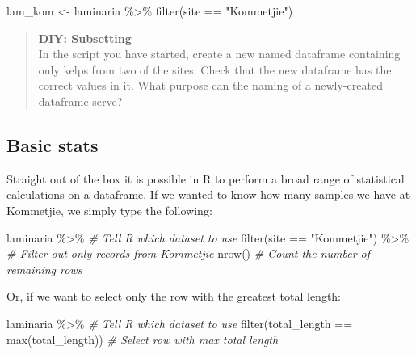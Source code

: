 \documentclass[
]{book}
\newenvironment{Shaded}{\begin{snugshade}}{\end{snugshade}}
\newcommand{\CommentTok}[1]{\textcolor[rgb]{0.56,0.35,0.01}{\textit{#1}}}
\newcommand{\FunctionTok}[1]{\textcolor[rgb]{0.00,0.00,0.00}{#1}}
\newcommand{\NormalTok}[1]{#1}
\newcommand{\OtherTok}[1]{\textcolor[rgb]{0.56,0.35,0.01}{#1}}
\newcommand{\SpecialCharTok}[1]{\textcolor[rgb]{0.00,0.00,0.00}{#1}}
\newcommand{\StringTok}[1]{\textcolor[rgb]{0.31,0.60,0.02}{#1}}
\begin{document}
\begin{Shaded}
\begin{Highlighting}[]
\NormalTok{lam\_kom }\OtherTok{\textless{}{-}}\NormalTok{ laminaria }\SpecialCharTok{\%\textgreater{}\%} 
  \FunctionTok{filter}\NormalTok{(site }\SpecialCharTok{==} \StringTok{"Kommetjie"}\NormalTok{)}
\end{Highlighting}
\end{Shaded}

\begin{quote}
\textbf{DIY: Subsetting}\\
In the script you have started, create a new named dataframe containing only kelps from two of the sites. Check that the new dataframe has the correct values in it. What purpose can the naming of a newly-created dataframe serve?
\end{quote}

\hypertarget{basic-stats}{%
\subsection{Basic stats}\label{basic-stats}}

Straight out of the box it is possible in R to perform a broad range of statistical calculations on a dataframe. If we wanted to know how many samples we have at Kommetjie, we simply type the following:

\begin{Shaded}
\begin{Highlighting}[]
\NormalTok{laminaria }\SpecialCharTok{\%\textgreater{}\%} \CommentTok{\# Tell R which dataset to use}
  \FunctionTok{filter}\NormalTok{(site }\SpecialCharTok{==} \StringTok{"Kommetjie"}\NormalTok{) }\SpecialCharTok{\%\textgreater{}\%} \CommentTok{\# Filter out only records from Kommetjie}
  \FunctionTok{nrow}\NormalTok{() }\CommentTok{\# Count the number of remaining rows}
\end{Highlighting}
\end{Shaded}

Or, if we want to select only the row with the greatest total length:

\begin{Shaded}
\begin{Highlighting}[]
\NormalTok{laminaria }\SpecialCharTok{\%\textgreater{}\%} \CommentTok{\# Tell R which dataset to use}
  \FunctionTok{filter}\NormalTok{(total\_length }\SpecialCharTok{==} \FunctionTok{max}\NormalTok{(total\_length)) }\CommentTok{\# Select row with max total length}
\end{Highlighting}
\end{Shaded}
\end{document}
